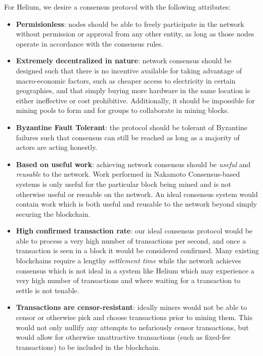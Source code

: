\documentclass[UTF8, 10pt, nonatbib, nocopyrightspace, reprint]{sigplanconf}
\begin{document}
For Helium, we desire a consensus protocol with the following attributes:

\begin{itemize}
  \item \textbf{Permisionless}: nodes should be able to freely participate in the network without permission or approval from any other entity, as long as those nodes operate in accordance with the consensus rules.
  \item \textbf{Extremely decentralized in nature}: network consensus should be designed such that there is no incentive available for taking advantage of macro-economic factors, such as cheaper access to electricity in certain geographies, and that simply buying more hardware in the same location is either ineffective or cost prohibitive. Additionally, it should be impossible for mining pools to form and for groups to collaborate in mining blocks.
  \item \textbf{Byzantine Fault Tolerant}: the protocol should be tolerant of Byzantine failures \cite{byzantine-failures} such that consensus can still be reached as long as a majority of actors are acting honestly. 
  \item \textbf{Based on useful work}: achieving network consensus should be \emph{useful} and \emph{reusable} to the network. Work performed in Nakamoto Consensus-based systems is only useful for the particular block being mined and is not otherwise useful or resuable on the network. An ideal consensus system would contain work which is both useful and reusable to the network beyond simply securing the blockchain.
  \item \textbf{High confirmed transaction rate}: our ideal consensus protocol would be able to process a very high number of transactions per second, and once a transaction is seen in a block it would be considered confirmed. Many existing blockchains require a lengthy \emph{settlement time} while the network achieves consensus which is not ideal in a system like Helium which may experience a very high number of transactions and where waiting for a transaction to settle is not tenable.
  \item \textbf{Transactions are censor-resistant}: ideally miners would not be able to censor or otherwise pick and choose transactions prior to mining them. This would not only nullify any attempts to nefariously censor transactions, but would allow for otherwise unattractive transactions (such as fixed-fee transactions) to be included in the blockchain.
\end{itemize}
\end{document}
